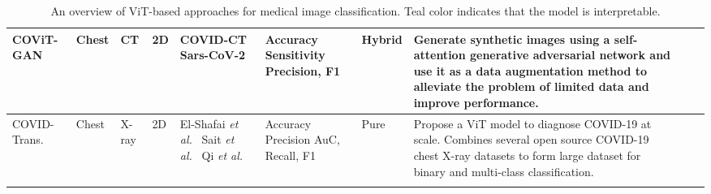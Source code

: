 \begin{table}[]
{\begin{tabular}{V{3}l|l|p{2cm}|l|p{2.5cm}|p{2cm}|l|p{7cm}V{3}}
COViT-GAN~\cite{ambita2021covit}     & Chest          & CT          & 2D                          & COVID-CT~\cite{kollias2021mia} \newline Sars-CoV-2~\cite{angelov2020sars}                                & Accuracy \newline Sensitivity \newline Precision, F1                                                                                                             & Hybrid               &  Generate synthetic images using a self-attention generative adversarial network and use it as a data augmentation method to alleviate the problem of limited data and improve performance.\\ \hline

{\color{teal}COVID-Trans.}\cite{shome2021covid}        & Chest          & X-ray     & 2D                        & El-Shafai \textit{et al.}~\cite{el2020extensive} \newline Sait \textit{et al.}~\cite{sait2020curated} \newline Qi \textit{et al.}~\cite{qi2021chest} & Accuracy \newline Precision \newline AuC, Recall, F1             & Pure           & Propose a ViT model to diagnose COVID-19 at scale. Combines several open source COVID-19 chest X-ray datasets to form large dataset  for binary and multi-class classification.        \\ 
\end{tabular}%
}
\caption{An overview of ViT-based approaches for medical image classification. {\color{teal} Teal color} indicates that the model is interpretable.}
\label{tab:class_taxonomy}
\end{table}

